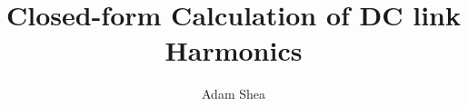 \documentclass[12pt]{article}
\begin{document}
%
\title{Closed-form Calculation of DC link Harmonics}
\author{Adam Shea}


\maketitle






\end{document}
